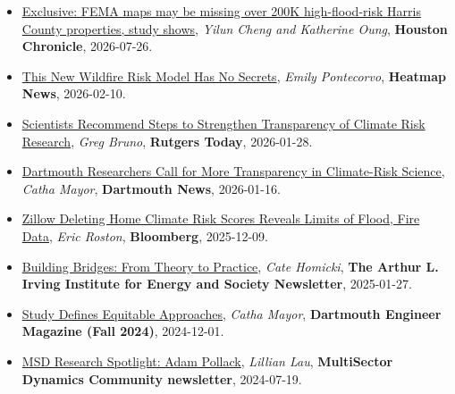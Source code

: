 \documentclass[10pt,oneside]{article}
\begin{document}
\begin{itemize}[label={}]
  
  \item \href{https://www.houstonchronicle.com/news/investigations/article/fema-flood-risk-study-22309575.php}{Exclusive: FEMA maps may be missing over 200K high-flood-risk Harris County properties, study shows}, \textit{Yilun Cheng and Katherine Oung}, \textbf{Houston Chronicle}, 2026-07-26.
        
  \item \href{https://heatmap.news/adaptation/carbonplan-fire-risk}{This New Wildfire Risk Model Has No Secrets}, \textit{Emily Pontecorvo}, \textbf{Heatmap News}, 2026-02-10.
        
  \item \href{https://www.rutgers.edu/news/scientists-recommend-steps-strengthen-transparency-climate-risk-research}{Scientists Recommend Steps to Strengthen Transparency of Climate Risk Research}, \textit{Greg Bruno}, \textbf{Rutgers Today}, 2026-01-28.
        
  \item \href{https://engineering.dartmouth.edu/news/researchers-call-for-more-transparency-in-climate-risk-science}{Dartmouth Researchers Call for More Transparency in Climate-Risk Science}, \textit{Catha Mayor}, \textbf{Dartmouth News}, 2026-01-16.
        
  \item \href{https://www.bloomberg.com/news/articles/2025-12-09/real-estate-climate-risk-score-debate-reveals-limits-of-flood-fire-modeling}{Zillow Deleting Home Climate Risk Scores Reveals Limits of Flood, Fire Data}, \textit{Eric Roston}, \textbf{Bloomberg}, 2025-12-09.
        
  \item \href{https://irving.dartmouth.edu/news/2025/01/building-bridges-theory-practice}{Building Bridges: From Theory to Practice}, \textit{Cate Homicki}, \textbf{The Arthur L. Irving Institute for Energy and Society Newsletter}, 2025-01-27.
        
  \item \href{https://cdn2.assets-servd.host/thayer-web/production/images/Dartmouth-Engineer-Magazine-Fall-2024.pdf?dm=1728076598}{Study Defines Equitable Approaches}, \textit{Catha Mayor}, \textbf{Dartmouth Engineer Magazine (Fall 2024)}, 2024-12-01.
        
  \item \href{https://eesm.science.energy.gov/news/msd-research-spotlight-adam-pollack}{MSD Research Spotlight: Adam Pollack}, \textit{Lillian Lau}, \textbf{MultiSector Dynamics Community newsletter}, 2024-07-19.
        

\end{itemize}
\end{document}
